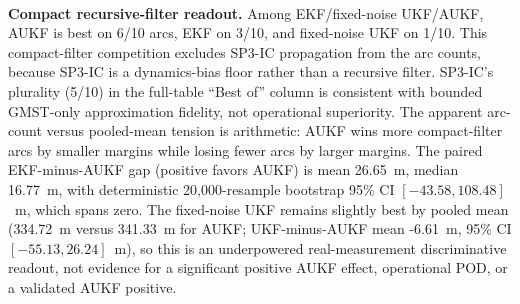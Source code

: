 \begin{table}[t]
  \centering
  \caption{Bounded precise-reference sanity probe and externally defined DBAR check. Range-only EKF, fixed-noise UKF, and innovation-adaptive UKF on 10 real ILRS LAGEOS-1 and LAGEOS-2 arcs; deterministic temporal split; held-out \emph{state} error against an \emph{independent} ILRS analysis-centre SP3-c precise orbit product. The Earth rotation is an approximate GMST-only transform applied identically to the station geometry and the SP3 reference (common-mode), with no precise SLR reduction, so magnitudes are at the bounded-fidelity hundreds-of-metres scale, not operational. ``SP3-IC propagation'' is the compact two-body+J2 model propagated from the SP3 initial condition (the dynamics-model-bias floor). The value of this slice is that the held-out error is scored against an independent precise reference and the DBAR outcome is defined externally.}
  \label{tab:real_slr_sp3_od}
  \\[2pt] {\footnotesize \textbf{Compact recursive-filter readout.} Among EKF/fixed-noise UKF/AUKF, AUKF is best on 6/10 arcs, EKF on 3/10, and fixed-noise UKF on 1/10. This compact-filter competition excludes SP3-IC propagation from the arc counts, because SP3-IC is a dynamics-bias floor rather than a recursive filter. SP3-IC's plurality (5/10) in the full-table ``Best of'' column is consistent with bounded GMST-only approximation fidelity, not operational superiority. The apparent arc-count versus pooled-mean tension is arithmetic: AUKF wins more compact-filter arcs by smaller margins while losing fewer arcs by larger margins. The paired EKF-minus-AUKF gap (positive favors AUKF) is mean 26.65~m, median 16.77~m, with deterministic 20,000-resample bootstrap 95\% CI $[-43.58,108.48]$~m, which spans zero. The fixed-noise UKF remains slightly best by pooled mean (334.72~m versus 341.33~m for AUKF; UKF-minus-AUKF mean -6.61~m, 95\% CI $[-55.13,26.24]$~m), so this is an underpowered real-measurement discriminative readout, not evidence for a significant positive AUKF effect, operational POD, or a validated AUKF positive.}

\end{table}
